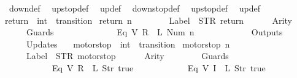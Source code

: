 \begin{isabellebody}
\ \ down{}{}{\isacharunderscore}def\isanewline
\ \ up{}{}stop{\isacharunderscore}def\isanewline
\ \ up{}{}{\isacharunderscore}def\isanewline
\ \ down{}{}stop{\isacharunderscore}def\isanewline
\ \ up{}{}stop{\isacharunderscore}def\isanewline
\ \ up{}{}{\isacharunderscore}def\isanewline
\isanewline
{}\isamarkupfalse%
\ return\ {\isacharcolon}{\isacharcolon}\ {\isachardoublequoteopen}int\ {\isasymRightarrow}\ transition{\isachardoublequoteclose}\ \isanewline
{\isachardoublequoteopen}return\ n\ {\isasymequiv}\ {\isasymlparr}\isanewline
\ \ \ \ \ \ Label\ {\isacharequal}\ STR\ {\isacharprime}{\isacharprime}return{\isacharprime}{\isacharprime}{\isacharcomma}\isanewline
\ \ \ \ \ \ Arity\ {\isacharequal}\ {}{\isacharcomma}\isanewline
\ \ \ \ \ \ Guards\ {\isacharequal}\ {\isacharbrackleft}\isanewline
\ \ \ \ \ \ \ \ \ \ \ \ {\isacharparenleft}Eq\ {\isacharparenleft}V\ {\isacharparenleft}R\ {}{\isacharparenright}{\isacharparenright}\ {\isacharparenleft}L\ {\isacharparenleft}Num\ n{\isacharparenright}{\isacharparenright}{\isacharparenright}\isanewline
\ \ \ \ \ \ {\isacharbrackright}{\isacharcomma}\isanewline
\ \ \ \ \ \ Outputs\ {\isacharequal}\ {\isacharbrackleft}{\isacharbrackright}{\isacharcomma}\isanewline
\ \ \ \ \ \ Updates\ {\isacharequal}\ {\isacharbrackleft}{\isacharbrackright}\isanewline
{\isasymrparr}{\isachardoublequoteclose}\isanewline
\isanewline
{}\isamarkupfalse%
\ motorstop\ {\isacharcolon}{\isacharcolon}\ {\isachardoublequoteopen}int\ {\isasymRightarrow}\ transition{\isachardoublequoteclose}\ \isanewline
{\isachardoublequoteopen}motorstop\ n\ {\isasymequiv}\ {\isasymlparr}\isanewline
\ \ \ \ \ \ Label\ {\isacharequal}\ STR\ {\isacharprime}{\isacharprime}motorstop{\isacharprime}{\isacharprime}{\isacharcomma}\isanewline
\ \ \ \ \ \ Arity\ {\isacharequal}\ {}{\isacharcomma}\isanewline
\ \ \ \ \ \ Guards\ {\isacharequal}\ {\isacharbrackleft}\isanewline
\ \ \ \ \ \ \ \ \ \ \ \ {\isacharparenleft}Eq\ {\isacharparenleft}V\ {\isacharparenleft}R\ {}{\isacharparenright}{\isacharparenright}\ {\isacharparenleft}L\ {\isacharparenleft}Str\ {\isacharprime}{\isacharprime}true{\isacharprime}{\isacharprime}{\isacharparenright}{\isacharparenright}{\isacharparenright}{\isacharcomma}\isanewline
\ \ \ \ \ \ \ \ \ \ \ \ {\isacharparenleft}Eq\ {\isacharparenleft}V\ {\isacharparenleft}I\ {}{\isacharparenright}{\isacharparenright}\ {\isacharparenleft}L\ {\isacharparenleft}Str\ {\isacharprime}{\isacharprime}true{\isacharprime}{\isacharprime}{\isacharparenright}{\isacharparenright}{\isacharparenright}{\isacharcomma}\isanewline

\end{isabellebody}

